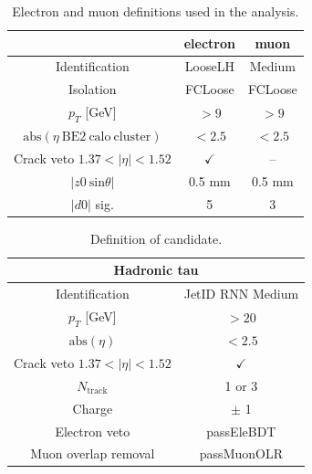\begin{table}
  \begin{center}
    \begin{tabular}{|c|c|c|}
      \hline
      & electron & muon\\
      \hline
      Identification                    & LooseLH & Medium\\
      Isolation                         & FCLoose & FCLoose\\
      $p_{T}$ [GeV]                     & $> 9$   & $> 9$\\
      $\mathrm{abs}(\eta~{\mathrm{BE2~calo~cluster}})$ & $< 2.5$ & $< 2.5$\\
      Crack veto $1.37 < |\eta| < 1.52$ & $\checkmark$ & -- \\
      $|z0~\mathrm{sin}\theta|$         & 0.5 mm & 0.5 mm \\
      $|d0|$ sig.                       & 5  & 3 \\
      \hline
    \end{tabular}
    \caption{\label{tab:objdef_1lep} Electron and muon definitions used in the analysis.}
  \end{center}
\end{table}

\begin{table}
  \begin{center}
    \begin{tabular}{|c|c|}
      \hline
      \multicolumn{2}{|c|}{Hadronic tau}    \\
      \hline
      Identification                    & JetID RNN Medium \\
      $p_{T}$ [GeV]                     & $> 20$ \\
      $\mathrm{abs}(\eta)$              & $< 2.5$ \\
      Crack veto $1.37 < |\eta| < 1.52$ & $\checkmark$ \\
      $N_{\mathrm{track}}$                        & 1 or 3\\
      Charge                            & $\pm$ 1\\
      Electron veto                     & passEleBDT\\
      Muon overlap removal              & passMuonOLR \\
      \hline
    \end{tabular}
    \caption{\label{tab:taudef_2taus} Definition of \tauh candidate.}
  \end{center}
\end{table}

